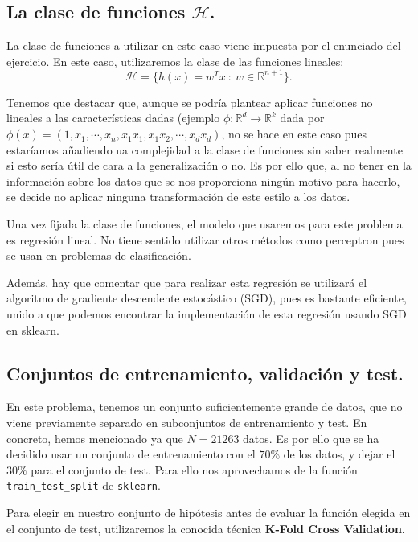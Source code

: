 \documentclass[a4paper, 20pt]{article}
\newcommand{\R}{\mathbb R}
\begin{document}
\subsection{La clase de funciones $\mathcal H$. }

La clase de funciones a utilizar en este caso viene impuesta por el enunciado del ejercicio. En este caso, utilizaremos la clase de las funciones lineales:
$$
\mathcal H = \{ h(x) = w^T x \ : \ w \in \R^{n+1}\}.
$$

Tenemos que destacar que, aunque se podría plantear aplicar funciones no lineales a las características dadas (ejemplo $\phi :\R^d \to \R^{k}$ dada por $\phi(x) = (1,x_1,\cdots,x_n,x_1x_1,x_1x_2,\cdots,x_dx_d)$, no se hace en este caso pues estaríamos añadiendo ua complejidad a la clase de funciones sin saber realmente si esto sería útil de cara a la generalización o no. Es por ello que, al no tener en la información sobre los datos que se nos proporciona ningún motivo para hacerlo, se decide no aplicar ninguna transformación de este estilo a los datos.

Una vez fijada la clase de funciones, el modelo que usaremos para este problema es regresión lineal. No tiene sentido utilizar otros métodos como perceptron pues se usan en problemas de clasificación. 

Además, hay que comentar que para realizar esta regresión se utilizará el algoritmo de gradiente descendente estocástico (SGD), pues es bastante eficiente, unido a que podemos encontrar la implementación de esta regresión usando SGD en sklearn.

\subsection{Conjuntos de entrenamiento, validación y test.}

En este problema, tenemos un conjunto suficientemente grande de datos, que no viene previamente separado en subconjuntos de entrenamiento y test. En concreto, hemos mencionado ya que $N = 21263$ datos. Es por ello que se ha decidido usar un conjunto de entrenamiento con el $70\%$ de los datos, y dejar el $30\%$ para el conjunto de test. Para ello nos aprovechamos de la función \lstinline{train_test_split} de \lstinline{sklearn}.

Para elegir en nuestro conjunto de hipótesis antes de evaluar la función elegida en el conjunto de test, utilizaremos la conocida técnica \textbf{K-Fold Cross Validation}.
\end{document}
